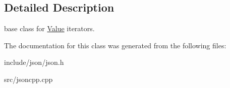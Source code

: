 \subsection{Detailed Description}
base class for \hyperlink{class_json_1_1_value}{Value} iterators. 



The documentation for this class was generated from the following files\-:\begin{DoxyCompactItemize}
\item 
include/json/json.\-h\item 
src/jsoncpp.\-cpp\end{DoxyCompactItemize}
